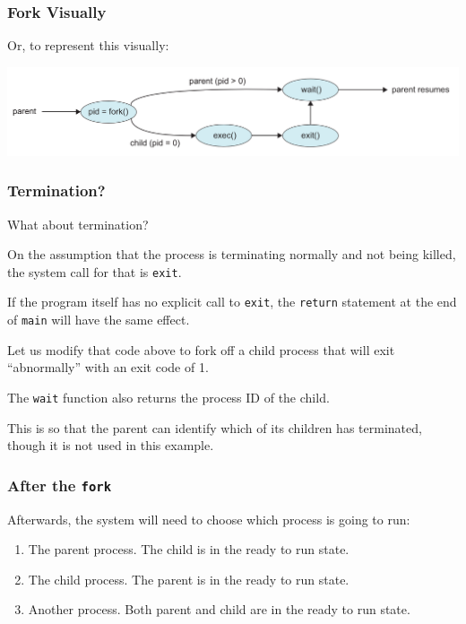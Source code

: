 \begin{frame}
\frametitle{Fork Visually}

Or, to represent this visually:

\begin{center}
\includegraphics[width=\textwidth]{images/fork-syscall.png}
\end{center}

\end{frame}

\begin{frame}
\frametitle{Termination?}

What about termination? 

On the assumption that the process is terminating normally and not being killed, the system call for that is \texttt{exit}. 

If the program itself has no explicit call to \texttt{exit}, the \texttt{return} statement at the end of \texttt{main} will have the same effect.

Let us modify that code above to fork off a child process that will exit ``abnormally'' with an exit code of 1. 

The \texttt{wait} function also returns the process ID of the child.

 This is so that the parent can identify which of its children has terminated, though it is not used in this example.

\end{frame}

\begin{frame}
\frametitle{After the \texttt{fork}}

Afterwards, the system will need to choose which process is going to run: 

\begin{enumerate}
	\item The parent process. The child is in the ready to run state.
	\item The child process. The parent is in the ready to run state.
	\item Another process. Both parent and child are in the ready to run state.
\end{enumerate}

\end{frame}


